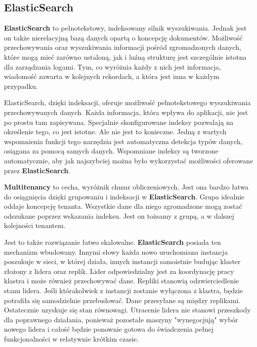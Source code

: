 \subsection{ElasticSearch}
\label{chapter:application:elkstack:elasticsearch}
    \textbf{ElasticSearch} to pełnotekstowy, indeksowany silnik wyszukiwania. Jednak jest on także
    nierelacyjną bazą danych opartą o koncepcję dokumentów. Możliwość przechowywania oraz wyszukiwania
    informacji pośród zgromadzonych danych, które mogą mieć zarówno ustaloną, jak i luźną strukturę jest
    szczególnie istotna dla zarządzania logami. Tym, co wyróżnia każdy z nich jest informacja, wiadomość
    zawarta w kolejnych rekordach, a która jest inna w każdym przypadku. 
    
    ElasticSearch, dzięki indeksacji, oferuje możliwość pełnotekstowego wyszukiwania przechowywanych danych. Każda informacja, która wpływa do aplikacji, nie jest po prostu tam zapisywana.
    Specjalnie skonfigurowane indeksy pozwalają na określenie tego, co jest istotne. Ale nie jest
    to konieczne. Jedną z wartych wspomnienia funkcji tego narzędzia jest automatyczna detekcja typów danych, osiągana za pomocą samych danych. Wspomniane indeksy są tworzone automatycznie, aby jak najszybciej można było
    wykorzystać możliwości oferowane przez \textbf{ElasticSearch}.
    
    \textbf{Multitenancy} to cecha, wyróżnik chmur obliczeniowych. Jest ona bardzo łatwa do osiągnięcia
    dzięki grupowaniu i indeksacji w \textbf{ElasticSearch}. Grupa idealnie oddaje koncepcję tenanta.
    Wszystkie dane dla niego zgromadzone mogą zostać odszukane poprzez wskazania indeksu. Jest on
    tożsamy z grupą, a w dalszej kolejności tenantem.
    
    Jest to także rozwiązanie łatwo skalowalne. \textbf{ElasticSearch} posiada ten mechanizm wbudowany.
    Innymi słowy każda nowo uruchomiana instancja poszukuje w sieci, w której działa, innych instancji
    samoistnie budując klaster złożony z lidera oraz replik. 
    Lider odpowiedzialny jest za koordynację pracy klastra i może również przechowywać dane.
    Repliki stanowią odzwierciedlenie stanu lidera. Jeśli którakolwiek z instancji zostanie wyłączona z klastra, będzie
    potrafiła się samodzielnie przebudować. Dane przesyłane są między replikami. Ostatecznie uzyskuje się
    stan równowagi. Utracenie lidera nie stanowi przeszkody dla poprawnego działania, ponieważ pozostałe maszyny 
    "wynegocjują" wybór nowego lidera i całość będzie ponownie gotowa do świadczenia pełnej funkcjonalności w relatywnie
    krótkim czasie.
    
